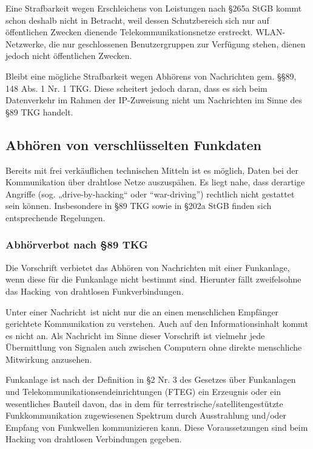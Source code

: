 \documentclass[10pt,a4paper]{article}
\begin{document}
Eine Strafbarkeit wegen Erschleichens von Leistungen nach §265a StGB kommt schon deshalb nicht in Betracht, weil dessen Schutzbereich sich nur auf öffentlichen Zwecken dienende Telekommunikationsnetze erstreckt. WLAN-Netzwerke, die nur geschlossenen Benutzergruppen zur Verfügung stehen, dienen jedoch nicht öffentlichen Zwecken.~\cite{Internetrecht}

Bleibt eine mögliche Strafbarkeit wegen Abhörens von Nachrichten gem. §§89, 148 Abs. 1 Nr. 1 TKG. Diese scheitert jedoch daran, dass es sich beim Datenverkehr im Rahmen der IP-Zuweisung nicht um Nachrichten im Sinne des §89 TKG handelt.~\cite{Internetrecht}

\subsection*{Abhören von verschlüsselten Funkdaten}
Bereits mit frei verkäuflichen technischen Mitteln ist es möglich, Daten bei der Kommunikation über drahtlose Netze auszuspähen. Es liegt nahe, dass derartige Angriffe (sog. „drive-by-hacking“ oder “war-driving”) rechtlich nicht gestattet sein können. Insbesondere in §89 TKG sowie in §202a StGB finden sich entsprechende Regelungen.~\cite{Datenschutz}


\subsubsection*{Abhörverbot nach §89 TKG}
Die Vorschrift verbietet das Abhören von Nachrichten mit einer Funkanlage, wenn diese für die Funkanlage nicht bestimmt sind. Hierunter fällt zweifelsohne das \glqq Hacking\grqq \ von drahtlosen Funkverbindungen.

Unter einer \glqq Nachricht\grqq \ ist nicht nur die an einen menschlichen Empfänger gerichtete Kommunikation zu verstehen. Auch auf den Informationsinhalt kommt es nicht an. Als Nachricht im Sinne dieser Vorschrift ist vielmehr jede Übermittlung von Signalen auch zwischen Computern ohne direkte menschliche Mitwirkung anzusehen.~\cite{Datenschutz}

Funkanlage ist nach der Definition in §2 Nr. 3 des Gesetzes über Funkanlagen und Telekommunikationsendeinrichtungen (FTEG) \glqq ein Erzeugnis oder ein wesentliches Bauteil davon, das in dem für terrestrische/satellitengestützte Funkkommunikation zugewiesenen Spektrum durch Ausstrahlung und/oder Empfang von Funkwellen kommunizieren kann\grqq. Diese Voraussetzungen sind beim Hacking von drahtlosen Verbindungen gegeben.
\end{document}
